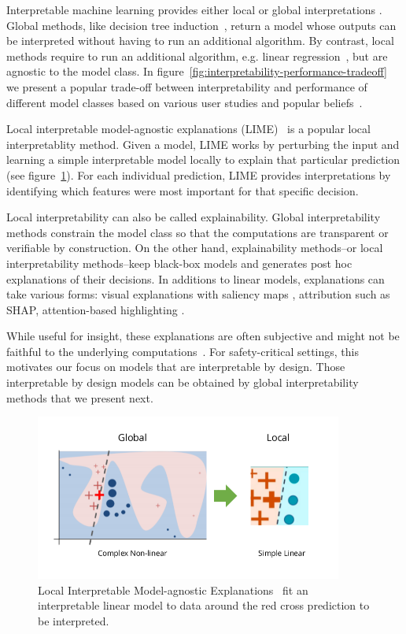 Interpretable machine learning provides either local or global interpretations \cite{glanois-survey}.
Global methods, like decision tree induction~\cite{breiman1984classification}, return a model whose outputs can be interpreted without having to run an additional algorithm.
By contrast, local methods require to run an additional algorithm, e.g. linear regression~\cite{regression}, but are agnostic to the model class.
In figure~\ref{fig:interpretability-performance-tradeoff} we present a popular trade-off between interpretability and performance of different model classes based on various user studies and popular beliefs~\cite{study-0,study-1,study-2,study-3,study-4,study-5,study-6,study-7}.

Local interpretable model-agnostic explanations (LIME)~\cite{lime} is a popular local interpretablity method.
Given a model, LIME works by perturbing the input and learning a simple interpretable model locally to explain that particular prediction (see figure~\ref{fig:lime}). 
For each individual prediction, LIME provides interpretations by identifying which features were most important for that specific decision.

Local interpretability can also be called explainability.
Global interpretability methods constrain the model class so that the computations are transparent or verifiable by construction. 
On the other hand, explainability methods--or local interpretability methods--keep black-box models and generates post hoc explanations of their decisions. 
In additions to linear models, explanations can take various forms: visual explanations with saliency maps \cite{Puri2020Explain}, attribution such as SHAP\cite{shap}, attention-based highlighting \cite{attention}.

While useful for insight, these explanations are often subjective and might not be faithful to the underlying computations~\cite{Atrey2020Exploratory}.
For safety-critical settings, this motivates our focus on models that are interpretable by design.
Those interpretable by design models can be obtained by global interpretability methods that we present next.

\begin{figure}
    \includegraphics[width=0.9\textwidth]{images/lime.png}
    \caption{Local Interpretable Model-agnostic Explanations~\cite{lime} fit an interpretable linear model to data around the red cross prediction to be interpreted.}\label{fig:lime}
\end{figure}



